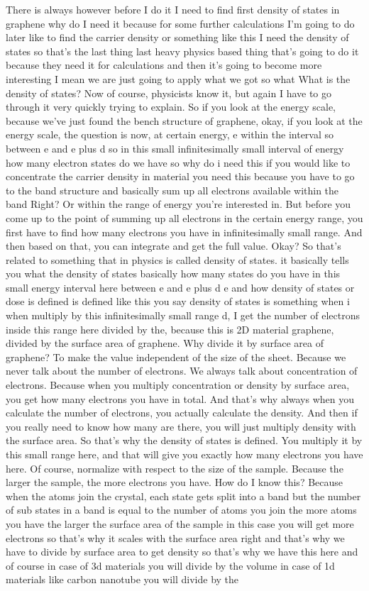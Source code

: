 There is always however before I do it I need to find first density of states in graphene why do I need it because for some further calculations I'm going to do later like to find the carrier density or something like this I need the density of states so that's the last thing last heavy physics based thing that's going to do it because they need it for calculations and then it's going to become more interesting I mean we are just going to apply what we got so what What is the density of states? Now of course, physicists know it, but again I have to go through it very quickly trying to explain. So if you look at the energy scale, because we've just found the bench structure of graphene, okay, if you look at the energy scale, the question is now, at certain energy, e within the interval so between e and e plus d so in this small infinitesimally small interval of energy how many electron states do we have so why do i need this if you would like to concentrate the carrier density in material you need this because you have to go to the band structure and basically sum up all electrons available within the band Right? Or within the range of energy you're interested in. But before you come up to the point of summing up all electrons in the certain energy range, you first have to find how many electrons you have in infinitesimally small range. And then based on that, you can integrate and get the full value. Okay? So that's related to something that in physics is called density of states. it basically tells you what the density of states basically how many states do you have in this small energy interval here between e and e plus d e and how density of states or dose is defined is defined like this you say density of states is something when i when multiply by this infinitesimally small range d, I get the number of electrons inside this range here divided by the, because this is 2D material graphene, divided by the surface area of graphene. Why divide it by surface area of graphene? To make the value independent of the size of the sheet. Because we never talk about the number of electrons. We always talk about concentration of electrons. Because when you multiply concentration or density by surface area, you get how many electrons you have in total. And that's why always when you calculate the number of electrons, you actually calculate the density. And then if you really need to know how many are there, you will just multiply density with the surface area. So that's why the density of states is defined. You multiply it by this small range here, and that will give you exactly how many electrons you have here. Of course, normalize with respect to the size of the sample. Because the larger the sample, the more electrons you have. How do I know this? Because when the atoms join the crystal, each state gets split into a band but the number of sub states in a band is equal to the number of atoms you join the more atoms you have the larger the surface area of the sample in this case you will get more electrons so that's why it scales with the surface area right and that's why we have to divide by surface area to get density so that's why we have this here and of course in case of 3d materials you will divide by the volume in case of 1d materials like carbon nanotube you will divide by the 